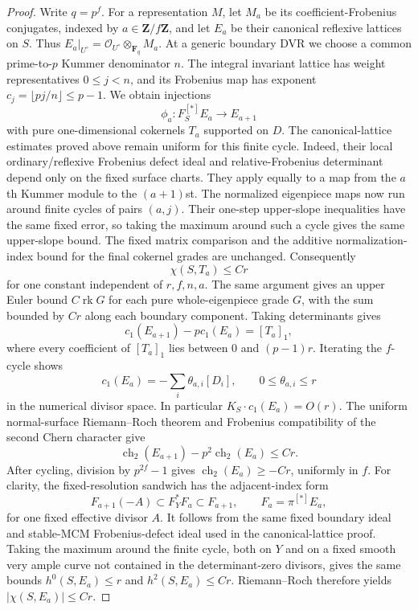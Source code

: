 \begin{proof}
Write $q=p^f$. For a representation $M$, let $M_a$ be its coefficient-Frobenius conjugates, indexed by $a\in\mathbf Z/f\mathbf Z$, and let $E_a$ be their canonical reflexive lattices on $S$. Thus $E_a|_{U^\circ}=\mathcal O_{U^\circ}\otimes_{\mathbf F_q}M_a$. At a generic boundary DVR we choose a common prime-to-$p$ Kummer denominator $n$. The integral invariant lattice has weight representatives $0\le j<n$, and its Frobenius map has exponent $c_j=\lfloor pj/n\rfloor\le p-1$. We obtain injections
\[\phi_a:F_S^{[*]}E_a\longrightarrow E_{a+1}\]
with pure one-dimensional cokernels $T_a$ supported on $D$.
The canonical-lattice estimates proved above remain uniform for this finite cycle. Indeed, their local ordinary/reflexive Frobenius defect ideal and relative-Frobenius determinant depend only on the fixed surface charts. They apply equally to a map from the $a$th Kummer module to the $(a+1)$st. The normalized eigenpiece maps now run around finite cycles of pairs $(a,j)$. Their one-step upper-slope inequalities have the same fixed error, so taking the maximum around such a cycle gives the same upper-slope bound. The fixed matrix comparison and the additive normalization-index bound for the final cokernel grades are unchanged. Consequently
\[\chi(S,T_a)\le C r\]
for one constant independent of $r,f,n,a$. The same argument gives an upper Euler bound $C\operatorname{rk}G$ for each pure whole-eigenpiece grade $G$, with the sum bounded by $Cr$ along each boundary component.
Taking determinants gives
\[c_1(E_{a+1})-p c_1(E_a)=[T_a]_1,\]
where every coefficient of $[T_a]_1$ lies between $0$ and $(p-1)r$. Iterating the $f$-cycle shows
\[c_1(E_a)=-\sum_i\theta_{a,i}[D_i],\qquad 0\le\theta_{a,i}\le r\]
in the numerical divisor space. In particular $K_S\cdot c_1(E_a)=O(r)$. The uniform normal-surface Riemann--Roch theorem \citep[Theorem~0.1]{C_Langer2026} and Frobenius compatibility of the second Chern character \citep[Theorem~4.5(2)]{C_Langer2025} give
\[\operatorname{ch}_2(E_{a+1})-p^2\operatorname{ch}_2(E_a)\le Cr.\]
After cycling, division by $p^{2f}-1$ gives $\operatorname{ch}_2(E_a)\ge-Cr$, uniformly in $f$.
For clarity, the fixed-resolution sandwich has the adjacent-index form
\[F_{a+1}(-A)\subset F_Y^*F_a\subset F_{a+1},\qquad F_a=\pi^{[*]}E_a,\]
for one fixed effective divisor $A$. It follows from the same fixed boundary ideal and stable-MCM Frobenius-defect ideal used in the canonical-lattice proof. Taking the maximum around the finite cycle, both on $Y$ and on a fixed smooth very ample curve not contained in the determinant-zero divisors, gives the same bounds $h^0(S,E_a)\le r$ and $h^2(S,E_a)\le Cr$. Riemann--Roch therefore yields $|\chi(S,E_a)|\le Cr$.

\end{proof}
